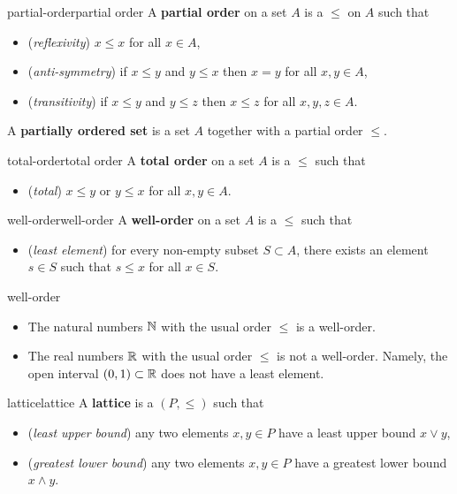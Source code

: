 \begin{topic}{partial-order}{partial order}
    A \textbf{partial order} on a set $A$ is a  $\le$ on $A$ such that
    \begin{itemize}
        \item (\textit{reflexivity}) $x \le x$ for all $x \in A$,
        \item (\textit{anti-symmetry}) if $x \le y$ and $y \le x$ then $x = y$ for all $x, y \in A$,
        \item (\textit{transitivity}) if $x \le y$ and $y \le z$ then $x \le z$ for all $x, y, z \in A$.
    \end{itemize}
    A \textbf{partially ordered set} is a set $A$ together with a partial order $\le$.
\end{topic}

\begin{topic}{total-order}{total order}
    A \textbf{total order} on a set $A$ is a  $\le$ such that
    \begin{itemize}
        \item (\textit{total}) $x \le y$ or $y \le x$ for all $x, y \in A$.
    \end{itemize}
\end{topic}

\begin{topic}{well-order}{well-order}
    A \textbf{well-order} on a set $A$ is a  $\le$ such that
    \begin{itemize}
        \item (\textit{least element}) for every non-empty subset $S \subset A$, there exists an element $s \in S$ such that $s \le x$ for all $x \in S$.
    \end{itemize}
\end{topic}

\begin{example}{well-order}
    \begin{itemize}
        \item The natural numbers $\mathbb{N}$ with the usual order $\le$ is a well-order.
        \item The real numbers $\mathbb{R}$ with the usual order $\le$ is not a well-order. Namely, the open interval $(0, 1) \subset \mathbb{R}$ does not have a least element.
    \end{itemize}
\end{example}

\begin{topic}{lattice}{lattice}
    A \textbf{lattice} is a  $(P, \le)$ such that
    \begin{itemize}
        \item (\textit{least upper bound}) any two elements $x, y \in P$ have a least upper bound $x \vee y$,
        \item (\textit{greatest lower bound}) any two elements $x, y \in P$ have a greatest lower bound $x \wedge y$.
    \end{itemize}
\end{topic}

